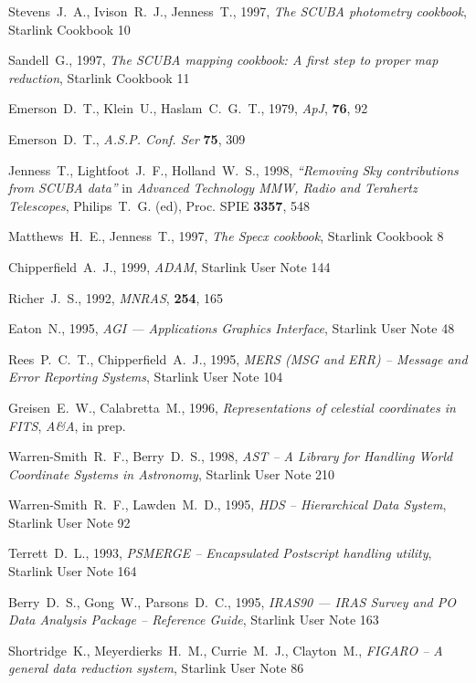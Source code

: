 \documentclass[twoside,11pt]{article}
\newcommand{\xref}[3]{#1}
\renewcommand{\_}{\texttt{\symbol{95}}}
\begin{document}
\begin{thebibliography}{}
Stevens~J.~A., Ivison~R.~J., Jenness~T., 1997, {\it The SCUBA photometry 
cookbook},
\xref{Starlink Cookbook 10}{sc10}{}

Sandell~G., 1997, {\it The SCUBA mapping cookbook: A first step to
proper map reduction}, \xref{Starlink Cookbook 11}{sc11}{}

Emerson~D.~T., Klein~U., Haslam~C.~G.~T., 1979, {\it ApJ}, {\bf 76}, 92

Emerson~D.~T., \textit{A.S.P. Conf. Ser} \textbf{75}, 309

Jenness~T., Lightfoot~J.~F., Holland~W.~S., 1998, 
\textit{``Removing Sky contributions from SCUBA data''} in \textit{Advanced
Technology MMW, Radio and Terahertz Telescopes}, Philips~T.~G. (ed),
Proc. SPIE \textbf{3357}, 548

Matthews~H.~E., Jenness~T., 1997,
\textit{The Specx cookbook}, \xref{Starlink Cookbook 8}{sc8}{}

Chipperfield~A.~J., 1999,
\textit{ADAM}, \xref{Starlink User Note 144}{sun144}{}

Richer~J.~S., 1992, {\it MNRAS}, {\bf 254}, 165

Eaton~N., 1995, {\it AGI --- Applications Graphics Interface},
\xref{Starlink User Note 48}{sun48}{}

Rees~P.~C.~T., Chipperfield~A.~J., 1995, {\it MERS (MSG and ERR) -- Message
and Error Reporting Systems}, \xref{Starlink User Note 104}{sun104}{}

Greisen~E.~W., Calabretta~M., 1996, {\it Representations of celestial
coordinates in FITS}, {\it A\&A}, in prep.

Warren-Smith~R.~F., Berry~D.~S., 1998, \textit{AST -- A Library for Handling
World Coordinate Systems in Astronomy},
\xref{Starlink User Note 210}{sun210}{}

Warren-Smith~R.~F., Lawden~M.~D., 1995, {\it HDS -- Hierarchical Data System},
\xref{Starlink User Note 92}{sun92}{}

Terrett~D.~L., 1993, {\it PSMERGE -- Encapsulated Postscript handling utility},
\xref{Starlink User Note 164}{sun164}{}

Berry~D.~S., Gong~W., Parsons~D.~C., 1995, {\it IRAS90 --- IRAS Survey and PO
Data Analysis Package -- Reference Guide}, \xref{Starlink User Note
163}{sun163}{} 

Shortridge~K., Meyerdierks~H.~M., Currie~M.~J., Clayton~M., 
{\it FIGARO -- A general data reduction system}, 
\xref{Starlink User Note 86}{sun86}{}


\end{thebibliography}
\end{document}
